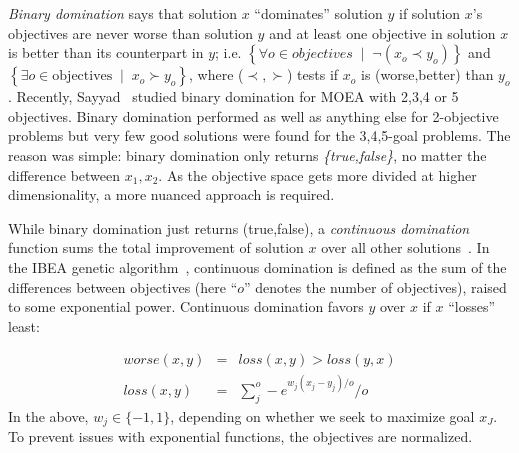 \documentclass[10pt,journal,compsoc]{IEEEtran}
\begin{document}
{\em Binary domination} says that solution $x$ ``dominates''
solution $y$ if solution $x$'s objectives are never worse than solution $y$ and at least one objective in solution $x$ is better than its counterpart in $y$; i.e.
 $\left\{ \forall o  \in \textit{objectives}\;\mid\; \neg ( x_o \prec y_o )\right\}$
and
 $\left\{
\exists o \in \text{objectives} \;\mid\; x_o \succ y_o\right\}$, where ($\prec,\succ$) tests if $x_o$ is (worse,better) than $y_o$.
Recently, Sayyad~\cite{sayyad13a} studied binary domination for MOEA with 2,3,4 or 5 objectives.  
Binary domination performed as well as anything else for 2-objective problems but very few good solutions were found for the 3,4,5-goal problems.  
The reason was simple: binary domination  only returns {\em \{true,false\}}, no matter the difference between $x_1,x_2$. 
As the objective space gets more divided at higher dimensionality, a more nuanced approach is required.


While binary domination just returns (true,false), a {\em continuous domination} function sums the total improvement of solution $x$ over all other solutions~\cite{Zitzler04indicator-basedselection}.
In the IBEA genetic algorithm~\cite{Zitzler04indicator-basedselection}, continuous domination is defined as the sum of the differences between objectives (here ``$o$'' denotes the number of objectives), raised to some exponential power.
Continuous domination favors $y$ over $x$ if $x$ ``losses'' least:

\begin{equation}\label{eq:cdom}
\begin{array}{rcl}
\textit{worse}(x,y)& =& \textit{loss}(x,y) > \textit{loss}(y,x)\\
\textit{loss}(x,y)& = &\sum_j^o -e^{w_j(x_j - y_j)/o	} / o
\end{array}
\end{equation}
In the above, $w_j\in \{-1,1\}$, depending on whether we seek to maximize goal $x_J$.   
To prevent issues with exponential functions, the objectives are normalized.

\end{document}
